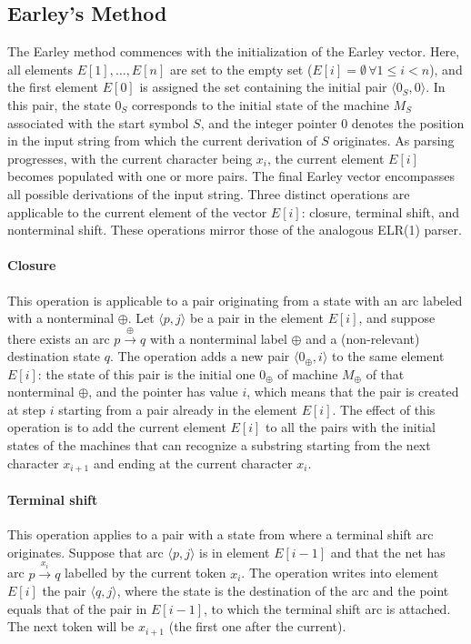 \subsection{Earley's Method}
The Earley method commences with the initialization of the Earley vector. 
Here, all elements $E[1],\dots, E[n]$ are set to the empty set ($E[i] = \emptyset \, \forall 1 \leq i < n$), and the first element $E[0]$ is assigned the set containing the initial pair $\langle 0_S, 0 \rangle$. 
In this pair, the state $0_S$ corresponds to the initial state of the machine $M_S$ associated with the start symbol $S$, and the integer pointer $0$ denotes the position in the input string from which the current derivation of $S$ originates.
As parsing progresses, with the current character being $x_i$, the current element $E[i]$ becomes populated with one or more pairs. 
The final Earley vector encompasses all possible derivations of the input string.
Three distinct operations are applicable to the current element of the vector $E[i]$: closure, terminal shift, and nonterminal shift.
These operations mirror those of the analogous ELR(1) parser.

\paragraph*{Closure}
This operation is applicable to a pair originating from a state with an arc labeled with a nonterminal $\oplus$.
Let $\langle p, j \rangle$ be a pair in the element $E[i]$, and suppose there exists an arc $p \xrightarrow{\oplus} q$ with a nonterminal label $\oplus$ and a (non-relevant) destination state $q$.
The operation adds a new pair $\langle 0_\oplus, i \rangle$ to the same element $E[i]$: the state of this pair is the initial one $0_\oplus$ of machine $M_\oplus$ of that nonterminal $\oplus$, and the pointer has value $i$, which means that the pair is created at step $i$ starting from a pair already in the element $E[i]$. 
The effect of this operation is to add the current element $E[i]$ to all the pairs with the initial states of the machines that can recognize a substring starting from the next character $x_{i+1}$ and ending at the current character $x_i$.

\paragraph*{Terminal shift}
This operation applies to a pair with a state from where a terminal shift arc originates.
Suppose that arc $\langle p, j \rangle$ is in element $E[i-1]$ and that the net has arc $p \xrightarrow{x_i} q$ labelled by the current token $x_i$.
The operation writes into element $E[i]$ the pair $\langle q, j \rangle$, where the state is the destination of the arc and the point equals that of the pair in $E[i-1]$, to which the terminal shift arc is attached.
The next token will be $x_{i+1}$ (the first one after the current).

